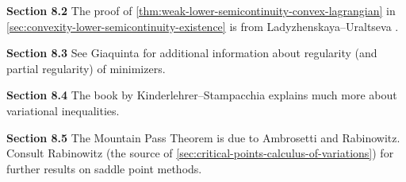 \textbf{Section 8.2} The proof of \cref{thm:weak-lower-semicontinuity-convex-lagrangian} in \cref{sec:convexity-lower-semicontinuity-existence} is from Ladyzhenskaya--Uraltseva \cite{LadyzhenskayaUraltseva1968}.

\textbf{Section 8.3} See Giaquinta \cite{Giaquinta1983} for additional information about regularity (and partial regularity) of minimizers.

\textbf{Section 8.4} The book by Kinderlehrer--Stampacchia \cite{KinderlehrerStampacchia1980} explains much more about variational inequalities.

\textbf{Section 8.5} The Mountain Pass Theorem is due to Ambrosetti and Rabinowitz. Consult Rabinowitz \cite{Rabinowitz1986} (the source of \cref{sec:critical-points-calculus-of-variations}) for further results on saddle point methods.
